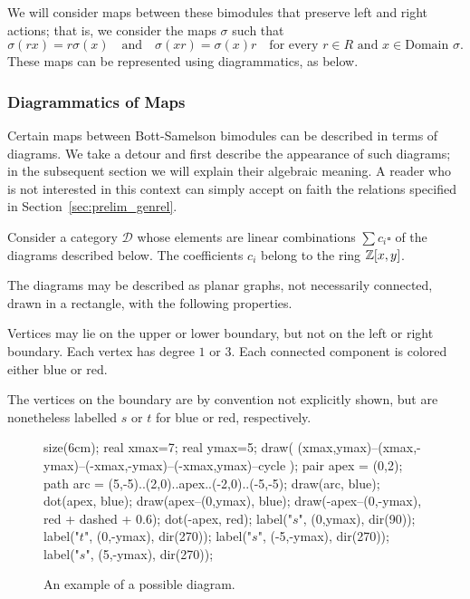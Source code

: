 We will consider maps between these bimodules that preserve left and right actions; that is, we consider the maps $\sigma$ such that
\begin{equation}
	\sigma(rx) = r\sigma(x) \quad\text{and}\quad \sigma(xr) = \sigma(x)r \quad\text{for every $r \in R$ and $x \in \text{Domain } \sigma$}.
	\label{eq:respect}
\end{equation}
These maps can be represented using diagrammatics, as below.

\subsubsection{Diagrammatics of Maps}
\label{sec:prelim_map}
\newcommand{\DD}{\mathcal D}
Certain maps between Bott-Samelson bimodules can be described in terms of diagrams.  We take a detour and first describe the appearance of such diagrams; in the subsequent section we will explain their algebraic meaning.  A reader who is not interested in this context can simply accept on faith the relations specified in Section~\ref{sec:prelim_genrel}.

Consider a category $\DD$ whose elements are linear combinations $\sum c_i \square$ of the diagrams described below.  The coefficients $c_i$ belong to the ring $\mathbb Z[x,y]$.

The diagrams may be described as planar graphs, not necessarily connected, drawn in a rectangle, with the following properties.
\begin{enumerate}[(i)]
	\ii Vertices may lie on the upper or lower boundary, but not on the left or right boundary.
	\ii Each vertex has degree $1$ or $3$.
	\ii Each connected component is colored either blue or red.
\end{enumerate}
The vertices on the boundary are by convention not explicitly shown, but are nonetheless labelled $s$ or $t$ for blue or red, respectively.

\begin{figure}[ht]
	\centering
	\begin{asy}
	size(6cm);
	real xmax=7;
	real ymax=5;
	draw( (xmax,ymax)--(xmax,-ymax)--(-xmax,-ymax)--(-xmax,ymax)--cycle );
	pair apex = (0,2);
	path arc = (5,-5)..(2,0)..apex..(-2,0)..(-5,-5);
	draw(arc, blue);
	dot(apex, blue);
	draw(apex--(0,ymax), blue);
	draw(-apex--(0,-ymax), red + dashed + 0.6);
	dot(-apex, red);
	label("$s$", (0,ymax), dir(90));
	label("$t$", (0,-ymax), dir(270));
	label("$s$", (-5,-ymax), dir(270));
	label("$s$", (5,-ymax), dir(270));
	\end{asy}
	\caption{An example of a possible diagram.}
	\label{fig:example_diagram}
\end{figure}

